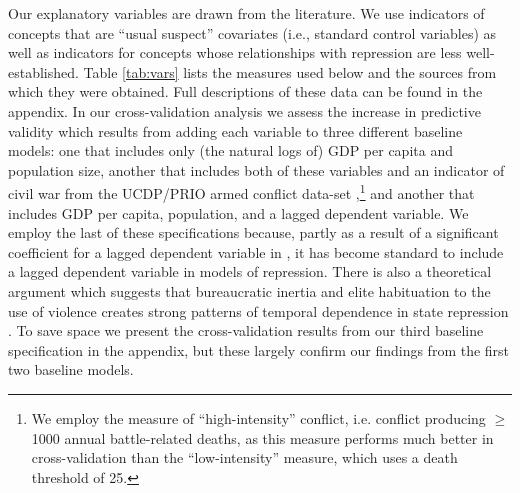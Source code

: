 \documentclass[11pt]{article}
\begin{document}
Our explanatory variables are drawn from the literature. We use indicators of concepts that are ``usual suspect'' covariates (i.e., standard control variables) as well as indicators for concepts whose relationships with repression are less well-established. Table \ref{tab:vars} lists the measures used below and the sources from which they were obtained. Full descriptions of these data can be found in the appendix. In our cross-validation analysis we assess the increase in predictive validity which results from adding each variable to three different baseline models: one that includes only (the natural logs of) GDP per capita and population size, another that includes both of these variables and an indicator of civil war from the UCDP/PRIO armed conflict data-set \citep{ThemnerWallensteen2012},\footnote{We employ the measure of ``high-intensity'' conflict, i.e. conflict producing $\geq$ 1000 annual battle-related deaths, as this measure performs much better in cross-validation than the ``low-intensity'' measure, which uses a death threshold of 25.} and another that includes GDP per capita, population, and a lagged dependent variable. We employ the last of these specifications because, partly as a result of a significant coefficient for a lagged dependent variable in \citet{PoeTate1994}, it has become standard to include a lagged dependent variable in models of repression. There is also a theoretical argument which suggests that bureaucratic inertia and elite habituation to the use of violence creates strong patterns of temporal dependence in state repression \citep[E.g.,][]{Gurr1988,Davenport2007}. To save space we present the cross-validation results from our third baseline specification in the appendix, but these largely confirm our findings from the first two baseline models. 
\end{document}
